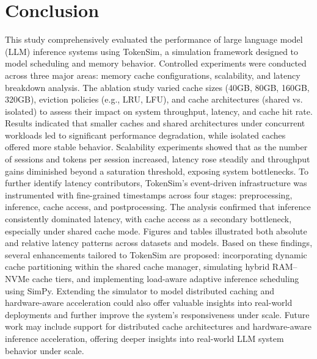 \documentclass[sigconf,nonacm]{acmart}
\begin{document}
\section {Conclusion}
 This study comprehensively evaluated the performance of large language model (LLM) inference systems using TokenSim, a simulation framework designed to model scheduling and memory behavior. Controlled experiments were conducted across three major areas: memory cache configurations, scalability, and latency breakdown analysis. The ablation study varied cache sizes (40GB, 80GB, 160GB, 320GB), eviction policies (e.g., LRU, LFU), and cache architectures (shared vs. isolated) to assess their impact on system throughput, latency, and cache hit rate. Results indicated that smaller caches and shared architectures under concurrent workloads led to significant performance degradation, while isolated caches offered more stable behavior. Scalability experiments showed that as the number of sessions and tokens per session increased, latency rose steadily and throughput gains diminished beyond a saturation threshold, exposing system bottlenecks. To further identify latency contributors, TokenSim’s event-driven infrastructure was instrumented with fine-grained timestamps across four stages: preprocessing, inference, cache access, and postprocessing. The analysis confirmed that inference consistently dominated latency, with cache access as a secondary bottleneck, especially under shared cache mode. Figures and tables illustrated both absolute and relative latency patterns across datasets and models. Based on these findings, several enhancements tailored to TokenSim are proposed: incorporating dynamic cache partitioning within the shared cache manager, simulating hybrid RAM–NVMe cache tiers, and implementing load-aware adaptive inference scheduling using SimPy. Extending the simulator to model distributed caching and hardware-aware acceleration could also offer valuable insights into real-world deployments and further improve the system’s responsiveness under scale. Future work may include support for distributed cache architectures and hardware-aware inference acceleration, offering deeper insights into real-world LLM system behavior under scale.
 


 

 
\end{document}
